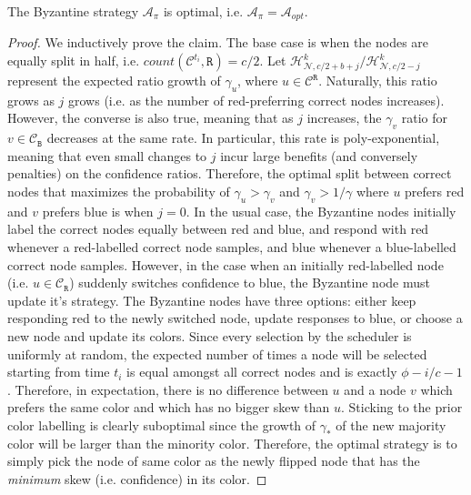 \begin{theorem}
The Byzantine strategy $\mathcal{A}_\pi$ is optimal, i.e. $\mathcal{A}_\pi = \mathcal{A}_{opt}$.
\end{theorem}
\begin{proof}
We inductively prove the claim. 
The base case is when the nodes are equally split in half, i.e. $count(\mathcal{C}^{t_i}, \mathtt{R}) = c/2$. Let $\mathcal{H}_{\mathcal{N}, c/2 + b + j}^k/\mathcal{H}_{\mathcal{N}, c/2 - j}^k$ represent the expected ratio growth of $\gamma_u$, where $u \in \mathcal{C}^\mathtt{R}$. 
Naturally, this ratio grows as $j$ grows (i.e. as the number of red-preferring correct nodes increases). 
However, the converse is also true, meaning that as $j$ increases, the $\gamma_v$ ratio for $v \in \mathcal{C}_\mathtt{B}$ decreases at the same rate. 
In particular, this rate is poly-exponential, meaning that even small changes to $j$ incur large benefits (and conversely penalties) on the confidence ratios. 
Therefore, the optimal split between correct nodes that maximizes the probability of $\gamma_u > \gamma_v$ and $\gamma_v > 1/\gamma$ where $u$ prefers red and $v$ prefers blue is when $j = 0$. 
In the usual case, the Byzantine nodes initially label the correct nodes equally between red and blue, and respond with red whenever a red-labelled correct node samples, and blue whenever a blue-labelled correct node samples. 
However, in the case when an initially red-labelled node (i.e. $u \in \mathcal{C}_\mathtt{R}$) suddenly switches confidence to blue, the Byzantine node must update it's strategy. 
The Byzantine nodes have three options: either keep responding red to the newly switched node, update responses to blue, or choose a new node and update its colors. 
Since every selection by the scheduler is uniformly at random, the expected number of times a node will be selected starting from time $t_i$ is equal amongst all correct nodes and is exactly $\phi - i / c - 1$. 
Therefore, in expectation, there is no difference between $u$ and a node $v$ which prefers the same color and which has no bigger skew than $u$. 
Sticking to the prior color labelling is clearly suboptimal since the growth of $\gamma_*$ of the new majority color will be larger than the minority color. Therefore, the optimal strategy is to simply pick the node of same color as the newly flipped node that has the \textit{minimum} skew (i.e. confidence) in its color. 
\end{proof}

